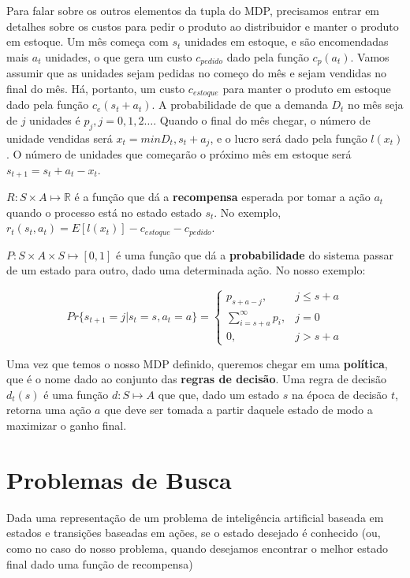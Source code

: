 Para falar sobre os outros elementos da tupla do MDP, precisamos entrar em detalhes sobre os
custos para pedir o produto ao distribuidor e manter o produto em estoque. Um mês começa com $s_t$
unidades em estoque, e são encomendadas mais $a_t$ unidades, o que gera um custo $c_{pedido}$ dado
pela função $c_p(a_t)$. Vamos assumir que as unidades sejam pedidas no começo do mês e sejam vendidas
no final do mês. Há, portanto, um custo $c_{estoque}$ para manter o produto em estoque dado pela função
$c_e(s_t + a_t)$. A probabilidade de que a demanda $D_t$ no mês seja de $j$ unidades é $p_j, j = 0,1,2\ldots$.
Quando o final do mês chegar, o número de unidade vendidas será $x_t = min{D_t, s_t + a_j}$, e o lucro
será dado pela função $l(x_t)$. O número de unidades que começarão o próximo mês em estoque será
$s_{t+1}= s_t + a_t - x_t$.

$R: S \times A \mapsto \mathbb{R}$ é a função que dá a \textbf{recompensa} esperada por tomar a ação $a_t$
quando o processo está no estado estado $s_t$. No exemplo, $r_t(s_t, a_t) = E[l(x_t)] - c_{estoque} - c_{pedido}$.

$P: S \times A \times S \mapsto [0,1]$ é uma função que dá a \textbf{probabilidade} do sistema passar de um estado
para outro, dado uma determinada ação. No nosso exemplo:

\begin{equation*}
  Pr\{s_{t+1} = j|s_t = s, a_t = a\} = \begin{cases}p_{s+a-j}, &j\le s + a \\
                                                    \sum\limits_{i=s+a}^\infty p_i, &j=0 \\
                                                    0, & j >s+a\end{cases}
\end{equation*}

Uma vez que temos o nosso MDP definido, queremos chegar em uma \textbf{política}, que é o nome dado
ao conjunto das \textbf{regras de decisão}. Uma regra de decisão $d_t(s)$ é uma função $d: S \mapsto A$
que que, dado um estado $s$ na época de decisão $t$, retorna uma ação $a$ que deve ser tomada a partir
daquele estado de modo a maximizar o ganho final.

\section{Problemas de Busca}
Dada uma representação de um problema de inteligência artificial baseada em estados e transições baseadas em ações, se o estado desejado é conhecido (ou, como no caso do nosso problema, quando desejamos encontrar o melhor estado final dado uma função de recompensa)

